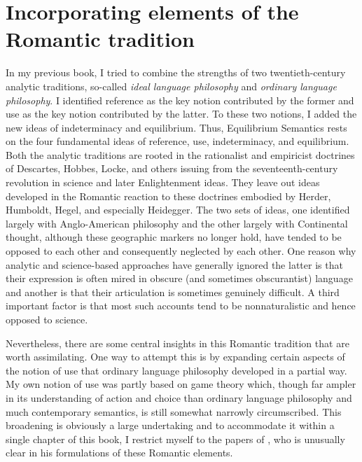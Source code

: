 \chapter{Incorporating elements of the Romantic tradition} \label{ch:romantic tradition}

In my previous book, I tried to combine the strengths of two twentieth-century analytic traditions, so-called \emph{ideal language philosophy} and \emph{ordinary language philosophy}. I identified reference as the key notion contributed by the former and use as the key notion contributed by the latter. To these two notions, I added the new ideas of indeterminacy and equilibrium. Thus, Equilibrium Semantics rests on the four fundamental ideas of reference, use, indeterminacy, and equilibrium. Both the analytic traditions are rooted in the rationalist and empiricist doctrines of Descartes, Hobbes, Locke, and others issuing from the seventeenth-century revolution in science and later Enlightenment ideas. They leave out ideas developed in the Romantic reaction to these doctrines embodied by Herder, Humboldt, Hegel, and especially Heidegger. The two sets of ideas, one identified largely with Anglo-American philosophy and the other largely with Continental thought, although these geographic markers no longer hold, have tended to be opposed to each other and consequently neglected by each other. One reason why analytic and science-based approaches have generally ignored the latter is that their expression is often mired in obscure (and sometimes obscurantist) language and another is that their articulation is sometimes genuinely difficult. A third important factor is that most such accounts tend to be nonnaturalistic and hence opposed to science.

Nevertheless, there are some central insights in this Romantic tradition that are worth assimilating. One way to attempt this is by expanding certain aspects of the notion of use that ordinary language philosophy developed in a partial way. My own notion of use was partly based on game theory which, though far ampler in its understanding of action and choice than ordinary language philosophy and much contemporary semantics, is still somewhat narrowly circumscribed. This broadening is obviously a large undertaking and to accommodate it within a single chapter of this book, I restrict myself to the papers of \citet{taylor:halpp}, who is unusually clear in his formulations of these Romantic elements.


